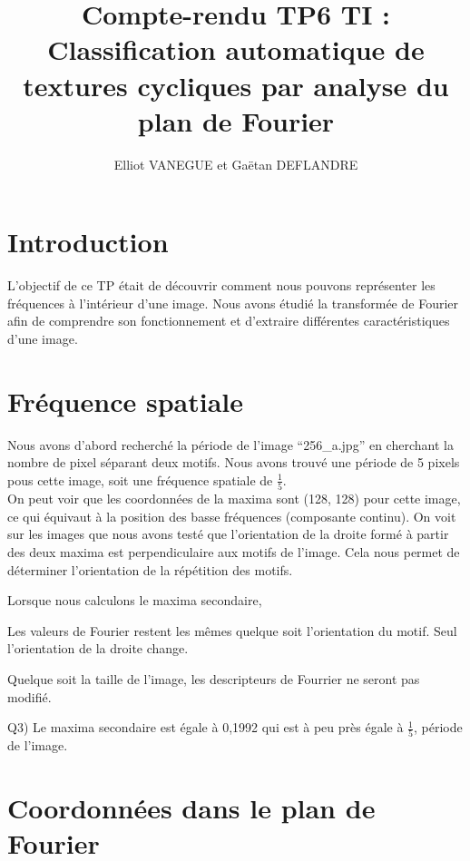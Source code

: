 \documentclass[a4paper,11pt]{article}
\title{Compte-rendu TP6 TI : Classification automatique de textures cycliques par analyse du plan de Fourier}
\author{Elliot VANEGUE et Gaëtan DEFLANDRE}
\begin{document}


  \maketitle
  
  \mbox{}
  \newpage
  \clearpage
  
  \section*{Introduction}
  L'objectif de ce TP était de découvrir comment nous pouvons représenter les fréquences à l'intérieur 
  d'une image. Nous avons étudié la transformée de Fourier afin de comprendre son fonctionnement et 
  d'extraire différentes caractéristiques d'une image.
  
  \section{Fréquence spatiale}
  Nous avons d'abord recherché la période de l'image \enquote{256\_a.jpg} en cherchant
  la nombre de pixel séparant deux motifs. Nous avons trouvé une période de 5 pixels pous cette 
  image, soit une fréquence spatiale de $\frac{1}{5}$.\\
  
  On peut voir que les coordonnées de la maxima sont (128, 128) pour cette image, ce qui équivaut 
  à la position des basse fréquences (composante continu). On voit sur les images que nous avons testé que l'orientation
  de la droite formé à partir des deux maxima est perpendiculaire aux motifs de l'image. Cela nous permet
  de déterminer l'orientation de la répétition des motifs.
  
  Lorsque nous calculons le maxima secondaire, 
  
  
  Les valeurs de Fourier restent les mêmes quelque soit l'orientation du motif. Seul l'orientation
  de la droite change.
  
  Quelque soit la taille de l'image, les descripteurs de Fourrier ne seront pas modifié.
  
  Q3) Le maxima secondaire est égale à 0,1992 qui est à peu près égale à $\frac{1}{5}$, période 
  de l'image.
  
  \section{Coordonnées dans le plan de Fourier}
  
\end{document}
